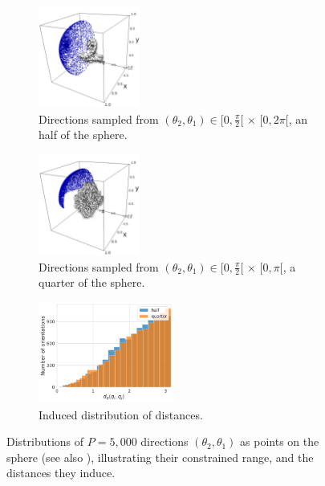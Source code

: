 \begin{figure}[ht!]
    \centering
    \begin{subfigure}[t]{0.32\linewidth}
        \centering
        \includegraphics[height=9em]{figures/5j0n-cvg.pdf}
        \caption{Directions sampled from $(\theta_2, \theta_1) \in [0,\frac{\pi}{2}[ \, \times \, [0,2\pi[$, an half of the sphere.}
    \end{subfigure}
    \hfill
    \begin{subfigure}[t]{0.32\linewidth}
        \centering
        \includegraphics[height=9em]{figures/5a1a-cvg.pdf}
        \caption{Directions sampled from $(\theta_2, \theta_1) \in [0,\frac{\pi}{2}[ \, \times \, [0,\pi[$, a quarter of the sphere.}
    \end{subfigure}
    \hfill
    \begin{subfigure}[t]{0.32\linewidth}
        \centering
        \includegraphics[height=9em]{figures/dQ_half_vs_quarter.pdf}
        \caption{Induced distribution of distances.}%
        \label{fig:orientation-constraints:distances}
    \end{subfigure}
    \caption{%
        Distributions of $P=5,000$ directions $(\theta_2, \theta_1)$ as points on the sphere (see also ), illustrating their constrained range, and the distances they induce.
    }\label{fig:orientation-constraints}
\end{figure}

